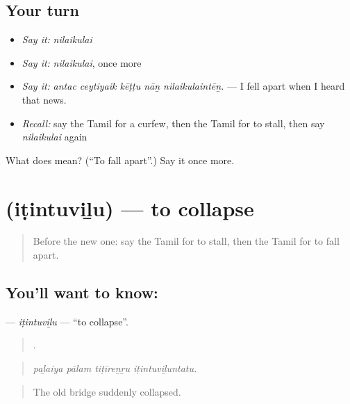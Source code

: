 \subsection*{Your turn}
\begin{itemize}
\raggedright
  \item \emph{Say it:} \emph{nilaikulai}
  \item \emph{Say it:} \emph{nilaikulai}, once more
  \item \emph{Say it:} \emph{antac ceytiyaik kēṭṭu nāṉ nilaikulaintēṉ.} — I fell apart when I heard that news.
  \item \emph{Recall:} say the Tamil for a curfew, then the Tamil for to stall, then say \emph{nilaikulai} again
\end{itemize}

\begin{tcolorbox}[breakable,colback=teal!4,colframe=teal!35!black,title={Before you move on}]
What does  mean? (\textquotedblleft{}To fall apart\textquotedblright{}.) Say it once more.
\end{tcolorbox}
\section[\texorpdfstring{\ta{இடிந்துவிழு} (iṭintuviḻu)}{இடிந்துவிழு (iṭintuviḻu)}]{ (iṭintuviḻu) — to collapse}

\label{lesson:TA-C300-itintuvilu}



\begin{quote}
Before the new one: say the Tamil for to stall, then the Tamil for to fall apart.
\end{quote}

\subsection*{You'll want to know: }
\textbf{} — \emph{iṭintuviḻu} — \textquotedblleft{}to collapse\textquotedblright{}.

\begin{quote}
   .
\end{quote}

\begin{quote}
\emph{paḻaiya pālam tiṭīreṉṟu iṭintuviḻuntatu.}
\end{quote}

\begin{quote}
The old bridge suddenly collapsed.
\end{quote}

